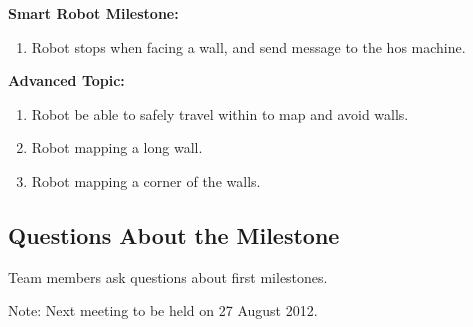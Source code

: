 \documentclass[11pt, a4paper]{article}
\begin{document}
\textbf{Smart Robot Milestone: }
\begin{enumerate}
\item Robot stops when facing a wall, and send message to the hos machine.
\end{enumerate}

\textbf{Advanced Topic: }
\begin{enumerate}
\item Robot be able to safely travel within to map and avoid walls.
\item Robot mapping a long wall.
\item Robot mapping a corner of the walls. 
\end{enumerate}

\subsection{Questions About the Milestone}
Team members ask questions about first milestones. 

\vspace*{10pt}
\noindent Note: Next meeting to be held on 27 August 2012.
\end{document}
